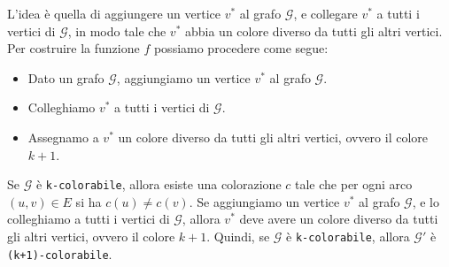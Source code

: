     \begin{figure}[H]
        \centering 
    \end{figure}
    L'idea è quella di aggiungere un vertice $v^*$ al grafo $\mathcal{G}$, e collegare $v^*$ a tutti i vertici
    di $\mathcal{G}$, in modo tale che $v^*$ abbia un colore diverso da tutti gli altri vertici.
    Per costruire la funzione $f$ possiamo procedere come segue:
    \begin{itemize}
        \item Dato un grafo $\mathcal{G}$, aggiungiamo un vertice $v^*$ al grafo $\mathcal{G}$.
        \item Colleghiamo $v^*$ a tutti i vertici di $\mathcal{G}$.
        \item Assegnamo a $v^*$ un colore diverso da tutti gli altri vertici, ovvero il colore $k+1$.
    \end{itemize}
    Se $\mathcal{G}$ è \texttt{k-colorabile}, allora esiste una colorazione $c$ tale che per ogni arco
    $(u,v) \in E$ si ha $c(u) \neq c(v)$. Se aggiungiamo un vertice $v^*$ al grafo $\mathcal{G}$, e lo colleghiamo
    a tutti i vertici di $\mathcal{G}$, allora $v^*$ deve avere un colore diverso da tutti gli altri vertici, ovvero
    il colore $k+1$. Quindi, se $\mathcal{G}$ è \texttt{k-colorabile}, allora $\mathcal{G'}$ è \texttt{(k+1)-colorabile}.
    
